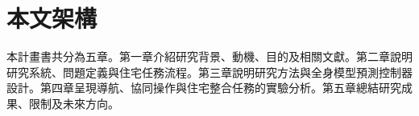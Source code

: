 
\section{本文架構}
\label{sec:thesis_organization}

本計畫書共分為五章。第一章介紹研究背景、動機、目的及相關文獻。第二章說明研究系統、問題定義與住宅任務流程。第三章說明研究方法與全身模型預測控制器設計。第四章呈現導航、協同操作與住宅整合任務的實驗分析。第五章總結研究成果、限制及未來方向。
